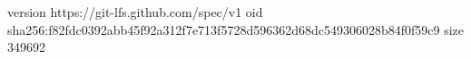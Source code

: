 version https://git-lfs.github.com/spec/v1
oid sha256:f82fdc0392abb45f92a312f7e713f5728d596362d68dc549306028b84f0f59c9
size 349692

